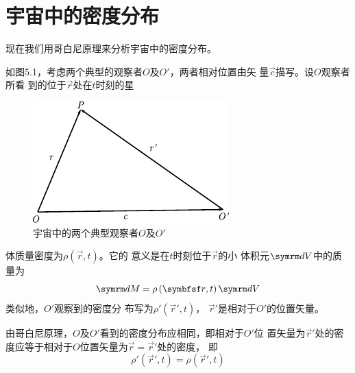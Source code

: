 \section{宇宙中的密度分布}\label{sec:05.02}

现在我们用哥白尼原理来分析宇宙中的密度分布。

如图5.1，考虑两个典型的观察者$ O $及$  O'   $，两者相对位置由矢
量$ \vec{c} $描写。设$ O $观察者所看
到的位于$ \vec{r} $处在$ t $时刻的星
\begin{figure}
    \centering
    \includegraphics{figure/fig05.01}
    \caption{宇宙中的两个典型观察者$ O $及$ O' $}
    \label{fig:05.01}
\end{figure}
体质量密度为$  \rho \left( \vec{r} , t \right)   $。它的
意义是在$ t $时刻位于$ \vec{r} $的小
体积元$ \dif V $中的质量为
{\setlength\mathindent{3em}
\begin{equation*}
    \dif M = \rho \left( \vec{r} , t \right) \dif V
\end{equation*}}
类似地，$ O' $观察到的密度分
布写为$  \rho ' \left( \vec{r} ' , t \right)   $， $ \vec{r} ' $是相对于$ O' $的位置矢量。

由哥白尼原理，$ O $及$ O' $看到的密度分布应相同，即相对于$ O' $位
置矢量为$ \vec{r} ' $处的密度应等于相对于$ O $位置矢量为$ \vec{r} = \vec{r} ' $处的密度，
即
\begin{equation}\label{eqn:05.02.01}
    \rho ' \left( \vec{r} ' , t \right) = \rho \left( \vec{r} ' , t \right)
\end{equation}

